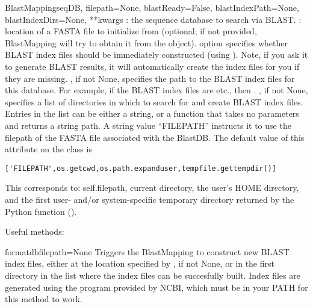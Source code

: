 \documentclass{howto}
\begin{document}
\begin{funcdesc}{BlastMapping}{seqDB, filepath=None,
                 blastReady=False, blastIndexPath=None, blastIndexDirs=None,
                 **kwargs}
  : the sequence database to search via BLAST.
  : location of a FASTA file to initialize from (optional;
  if not provided, BlastMapping will try to obtain it from the
   object).
   option specifies whether BLAST index files should
  be immediately
  constructed (using ).  Note, if you ask it to generate
  BLAST results, it will automatically create the index files for you
  if they are missing.
  , if not None, specifies the path to the BLAST index
  files for this database.  For example, if the BLAST index files are
   etc., then .
  , if not None, specifies a list of directories in which
  to search for and create BLAST index files.  Entries in the list can be
  either a string, or a function that takes no parameters and returns 
  a string path.  A string value ``FILEPATH'' instructs it to use the 
  filepath of the FASTA file associated with the BlastDB.
  The default value of this attribute on the  class is 
\begin{verbatim}
['FILEPATH',os.getcwd,os.path.expanduser,tempfile.gettempdir()]
\end{verbatim}
This corresponds to: self.filepath, current directory, the user's HOME
directory, and the first user- and/or system-specific temporary directory returned
by the Python function ().
\end{funcdesc}

Useful methods:
\begin{funcdesc}{formatdb}{filepath=None}
  Triggers the BlastMapping to construct new BLAST index files, either at the
  location specified by , if not None, or in the first
  directory in the  list where the index files
  can be succesfully built.  Index files are generated using the 
   program provided by NCBI, which must be in your
  PATH for this method to work.
\end{funcdesc}
\end{document}
